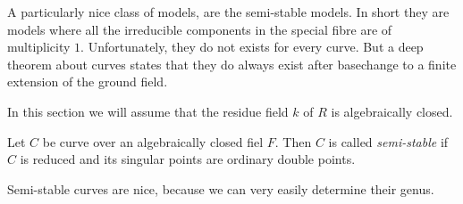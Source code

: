 A particularly nice class of models, are the semi-stable models.
In short they are models where all the irreducible components in the special fibre are of multiplicity $1$. 
Unfortunately, they do not exists for every curve. 
But a deep theorem about curves states that they do always exist after basechange to a finite extension of the ground field. 

In this section we will assume that the residue field $k$ of $R$ is algebraically closed. 

\begin{definition}\label{def:semi_stable_curve}
	Let $C $ be curve over an algebraically closed fiel $F$. 
	Then $C$ is called \emph{semi-stable} if $C$ is reduced and its singular points are ordinary double points. 
\end{definition}


Semi-stable curves are nice, because we can very easily determine their genus. 
\begin{comment}
	
\begin{lemma}
	Let $C$ be a semi-stable curve over an algebraically closed fiel $F$. 
	Let $C'$ be the normalisation of $C$ and $f: C' \to C$ the induced morphism.  
	Then there is an exact sequence \[
	0 \to f_* \omega_{C' / F} \to \omega_{C / F} \to \mathcal{F}  \to 0
	.\] 
	where $\mathcal{F} $ is the skyscraper sheaf which vasishes in the smooth locus of $C$ and for $x$ in the singular locus of $C$ we have $\mathcal{F} _x  = F$. 
\end{lemma}
\todo{Do we need this lemma???}
\begin{proof}
	Intuitively, $C'$ is the disjoint union of the normalisations of the irreducible componets of $C$. 
	So $C'$ consists of the same irreducible components, but they are no longer connected along the intersection points. 
	So along the smooth locus of $C$, the map $f_* \omega_{C' / F} \to \omega_{C / F}$ is an isomorphism, and thus $\mathcal{F} $ vanishes on the smooth locus of $C$. 

	Lets now consider a singular point $x$ on $C$. 
	Then $f^{-1}(x)$ are two smooth points.
	Hence the morphism on residue fields $(f_* \omega_{C' / F})_x \to (\omega_{C  /F})_x$ is $F \to F^2$ and thus $\mathcal{F} _x \simeq F$ \todo{this does not make sense?}
	
	For a more detailed argument see \cite[lem.\ 10.3.12]{liuAlgebraicGeometryArithmetic2002}. 
\end{proof}
\end{comment}

